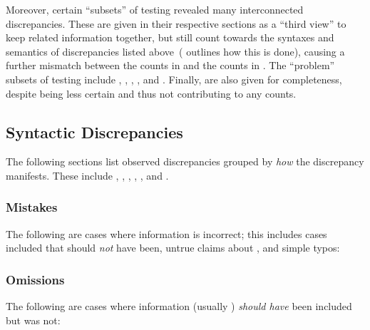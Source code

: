 Moreover, certain ``subsets'' of testing revealed many interconnected
discrepancies. These are given in their respective sections as a ``third view''
to keep related information together, but still count towards the syntaxes and
semantics of discrepancies listed above\ifnotpaper\ (
    outlines how this is done)\fi, causing a further mismatch between the counts
in  and the counts in . The ``problem'' subsets of testing include
, \ifnotpaper{}, \fi
{}, , and .
\ifnotpaper Finally,  are also given for completeness,
    despite being less certain and thus not contributing to any counts.

    \begin{landscape}
        \sntxDiscrepsTable{}
        \smntcDiscrepsTable{}
    \end{landscape}

    
     \fi

\subsection{Syntactic Discrepancies}
\label{sntxDiscreps}

The following sections list observed discrepancies grouped by \emph{how} the
discrepancy manifests. These include , ,
, , , and \reduns{}.

\subsubsection{Mistakes}
\label{wrong}
The following are cases where information is incorrect; this includes cases
\terms{} included that should \emph{not} have been, untrue claims about
\cites{}, and simple typos:



\subsubsection{Omissions}
\label{miss}
The following are cases where information (usually ) \emph{should have}
been included but was not:




